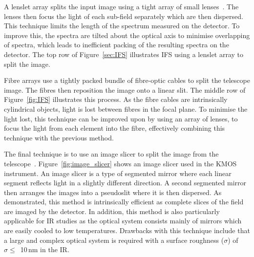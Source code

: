 A lenslet array splits the input image using a tight array of small lenses~\citep{1995A&AS..113..347B}.
The lenses then focus the light of each sub-field separately which are then dispersed.
This technique limits the length of the spectrum measured on the detector.
To improve this, the spectra are tilted about the optical axis to minimise overlapping of spectra, which leads to inefficient packing of the resulting spectra on the detector.
The top row of Figure~\ref{sec:IFS} illustrates IFS using a lenslet array to split the image.


Fibre arrays use a tightly packed bundle of fibre-optic cables to split the telescope image.
The fibres then reposition the image onto a linear slit.
The middle row of Figure~\ref{fig:IFS} illustrates this process.
As the fibre cables are intrinsically cylindrical objects, light is lost between fibres in the focal plane.
To minimise the light lost, this technique can be improved upon by using an array of lenses, to focus the light from each element into the fibre, effectively combining this technique with the previous method.

The final technique is to use an image slicer to split the image from the telescope~\citep{1997SPIE.2871.1295C}.
Figure~\ref{fig:image_slicer} shows an image slicer used in the KMOS instrument.
An image slicer is a type of segmented mirror where each linear segment reflects light in a slightly different direction.
A second segmented mirror then arranges the images into a pseudoslit where it is then dispersed.
As~\cite{2006NewAR..50..244A} demonstrated, this method is intrinsically efficient as complete slices of the field are imaged by the detector.
In addition, this method is also particularly applicable for IR studies as the optical system consists mainly of mirrors which are easily cooled to low temperatures.
Drawbacks with this technique include that a large and complex optical system is required with a surface roughness ($\sigma$) of $\sigma \leq$~10\,nm in the IR.

